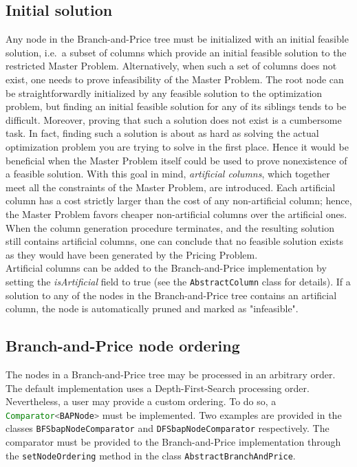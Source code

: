 \documentclass[a4paper]{article}
\newcommand{\code}[1]{\lstinline[language=java, style=seminar]!#1!}
\begin{document}
 
\subsection{Initial solution}\label{subsec:initSolution}
Any node in the Branch-and-Price tree must be initialized with an initial feasible solution, i.e.\ a subset of columns which provide an initial feasible solution to the restricted Master Problem. Alternatively, when such a set of columns does not exist, one needs to prove infeasibility of the Master Problem. The root node can be straightforwardly initialized by any feasible solution to the optimization problem, but finding an initial feasible solution for any of its siblings tends to be difficult. Moreover, proving that such a solution does not exist is a cumbersome task. In fact, finding such a solution is about as hard as solving the actual optimization problem you are trying to solve in the first place. Hence it would be beneficial when the Master Problem itself could be used to prove nonexistence of a feasible solution. With this goal in mind, \emph{artificial columns},
which together meet all the constraints of the Master Problem, are introduced. Each artificial column has a cost strictly larger than the cost of any non-artificial column; hence, the Master Problem favors cheaper
non-artificial columns over the artificial ones. When the column generation procedure terminates, and the resulting solution still contains artificial columns, one can conclude that no feasible solution exists as they would have been generated by the Pricing Problem.\\
Artificial columns can be added to the Branch-and-Price implementation by setting the \emph{isArtificial} field to true (see the \code{AbstractColumn} class for details). If a solution to any of the nodes in the Branch-and-Price tree contains an artificial column, the node is automatically pruned and marked as "infeasible".

\subsection{Branch-and-Price node ordering}
The nodes in a Branch-and-Price tree may be processed in an arbitrary order. The default implementation uses a Depth-First-Search processing order. Nevertheless, a user may provide a custom ordering. To do so, a \code{Comparator<BAPNode>} must be implemented. Two examples are provided in the classes \code{BFSbapNodeComparator} and \code{DFSbapNodeComparator} respectively. The comparator must be provided to the Branch-and-Price implementation through the \code{setNodeOrdering} method in the class \code{AbstractBranchAndPrice}.\\
\end{document}
